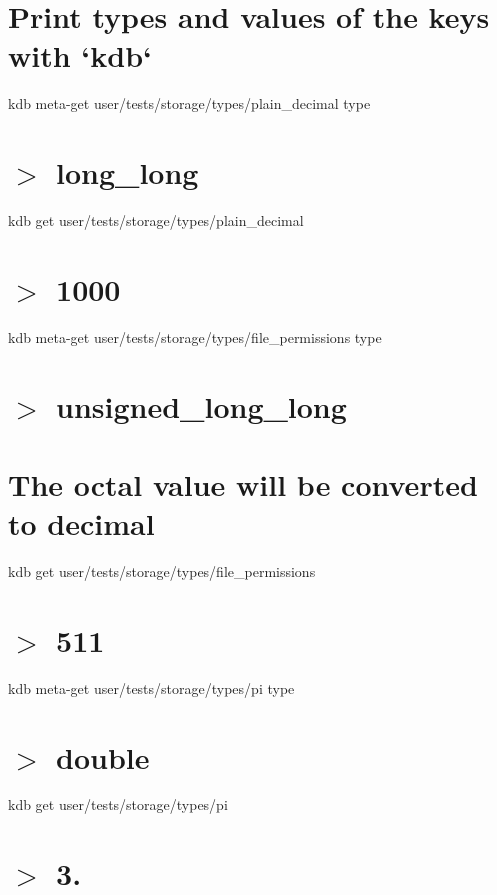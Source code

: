 \hypertarget{autotoc_md693_autotoc_md703}{}\section{Print types and values of the keys with `kdb`}\label{autotoc_md693_autotoc_md703}
kdb meta-\/get \textquotesingle{}user/tests/storage/types/plain\+\_\+decimal\textquotesingle{} \textquotesingle{}type\textquotesingle{} \hypertarget{autotoc_md693_autotoc_md704}{}\section{$>$ long\+\_\+long}\label{autotoc_md693_autotoc_md704}
kdb get \textquotesingle{}user/tests/storage/types/plain\+\_\+decimal\textquotesingle{} \hypertarget{autotoc_md693_autotoc_md705}{}\section{$>$ 1000}\label{autotoc_md693_autotoc_md705}
kdb meta-\/get \textquotesingle{}user/tests/storage/types/file\+\_\+permissions\textquotesingle{} \textquotesingle{}type\textquotesingle{} \hypertarget{autotoc_md693_autotoc_md706}{}\section{$>$ unsigned\+\_\+long\+\_\+long}\label{autotoc_md693_autotoc_md706}
\hypertarget{autotoc_md693_autotoc_md707}{}\section{The octal value will be converted to decimal}\label{autotoc_md693_autotoc_md707}
kdb get \textquotesingle{}user/tests/storage/types/file\+\_\+permissions\textquotesingle{} \hypertarget{autotoc_md693_autotoc_md708}{}\section{$>$ 511}\label{autotoc_md693_autotoc_md708}
kdb meta-\/get \textquotesingle{}user/tests/storage/types/pi\textquotesingle{} \textquotesingle{}type\textquotesingle{} \hypertarget{autotoc_md693_autotoc_md709}{}\section{$>$ double}\label{autotoc_md693_autotoc_md709}
kdb get \textquotesingle{}user/tests/storage/types/pi\textquotesingle{} \hypertarget{autotoc_md693_autotoc_md710}{}\section{$>$ 3.}\label{autotoc_md693_autotoc_md710}
